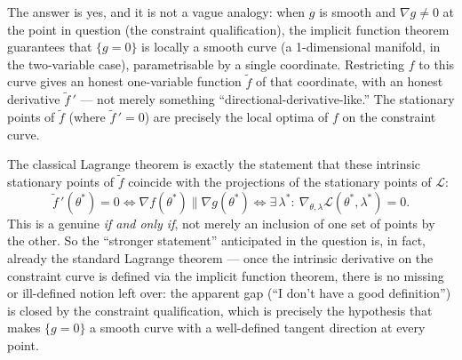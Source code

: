 \documentclass[a4paper,oneside,12pt]{extarticle}
\theoremstyle{plain}
\theoremstyle{definition}
\theoremstyle{remark}
\begin{document}
The answer is yes, and it is not a vague analogy: when $g$ is
smooth and $\nabla g\ne 0$ at the point in question (the constraint
qualification), the implicit function theorem guarantees that
$\{g=0\}$ is locally a smooth curve (a 1-dimensional manifold,
in the two-variable case), parametrisable by a single coordinate.
Restricting $f$ to this curve gives an honest one-variable function
$\tilde f$ of that coordinate, with an honest derivative
$\tilde f\,'$ --- not merely something ``directional-derivative-like.''
The stationary points of $\tilde f$ (where $\tilde f\,'=0$) are
precisely the local optima of $f$ on the constraint curve.

The classical Lagrange theorem is exactly the statement that these
intrinsic stationary points of $\tilde f$ coincide with the
projections of the stationary points of $\mathcal{L}$:
\[
  \tilde f\,'(\theta^*) = 0
  \iff
  \nabla f(\theta^*) \parallel \nabla g(\theta^*)
  \iff
  \exists\,\lambda^*:\ \nabla_{\theta,\lambda}\mathcal{L}(\theta^*,\lambda^*)=0.
\]
This is a genuine \emph{if and only if}, not merely an inclusion of
one set of points by the other.  So the ``stronger statement''
anticipated in the question is, in fact, already the standard
Lagrange theorem --- once the intrinsic derivative on the
constraint curve is defined via the implicit function theorem,
there is no missing or ill-defined notion left over: the apparent
gap (``I don't have a good definition'') is closed by the
constraint qualification, which is precisely the hypothesis that
makes $\{g=0\}$ a smooth curve with a well-defined tangent direction
at every point.

\end{document}
